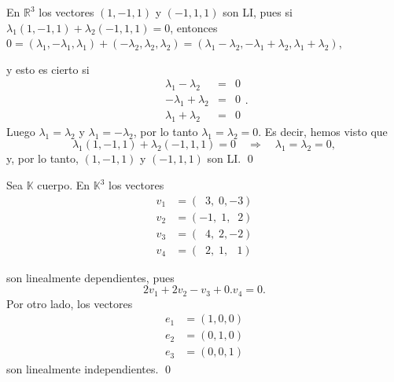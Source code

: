\documentclass[handout]{beamer} %
\newcommand{\R}{\mathbb R}
\newcommand{\K}{\mathbb K}
\begin{document}
   
\begin{frame}
     
\begin{ejemplo}
    En $\R^3$  los vectores $(1,-1,1)$ y $(-1,1,1)$ son LI, pues si $\lambda_1(1,-1,1)+\lambda_2(-1,1,1) =0$,  entonces $0= (\lambda_1,-\lambda_1,\lambda_1)+(-\lambda_2,\lambda_2,\lambda_2) =  (\lambda_1-\lambda_2,-\lambda_1+\lambda_2,\lambda_1+\lambda_2)$, 
    
    y esto es cierto si 
    \begin{equation*}
        \begin{array}{rcl}
        \lambda_1-\lambda_2 &=& 0 \\
        -\lambda_1+\lambda_2 &=& 0 \\
        \lambda_1+\lambda_2 &=& 0 
        \end{array}.
    \end{equation*} 
    Luego $\lambda_1 = \lambda_2$ y $\lambda_1 = -\lambda_2$, por lo tanto $\lambda_1 = \lambda_2 =0$. Es decir,  hemos visto que 
    $$
    \lambda_1(1,-1,1)+\lambda_2(-1,1,1) =0 \quad \Rightarrow \quad\lambda_1 = \lambda_2 =0,
    $$
    y, por lo tanto,  $(1,-1,1)$ y $(-1,1,1)$ son LI. \qed
\end{ejemplo}
\end{frame}  
    
   
    \begin{frame}
     
\begin{ejemplo} Sea $\K$  cuerpo. En $\K^3$ los vectores
    \begin{align*}
    v_1 &= (\;\;3,\;0,-3) \\
    v_2 &= (-1,\;1,\;\;2) \\
    v_3 &= (\;\;4,\;2,-2) \\
    v_4 &= (\;\;2,\;1,\,\;\;1)
    \end{align*}
    
    son linealmente dependientes, pues
    $$
    2v_1+2v_2 -v_3 +0.v_4 =0.
    $$
    Por otro lado, los vectores
    \begin{align*}
    e_1 &= (1,0,0) \\
    e_2 &= (0,1,0) \\
    e_3 &= (0,0,1) 
    \end{align*}
    son linealmente independientes. \qed
\end{ejemplo}

    \end{frame}  
    
\end{document}

